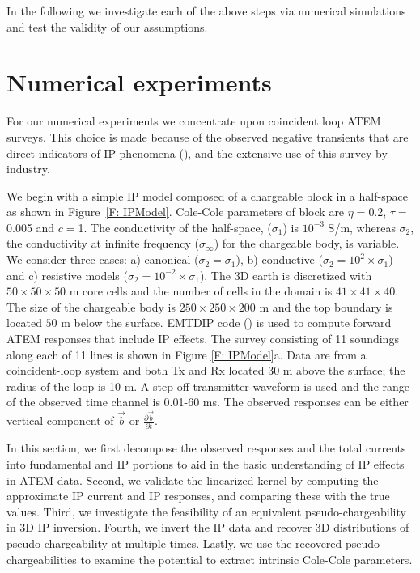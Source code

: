 \documentclass[a4paper, 11pt]{article}
\newcommand{\siginf}{\sigma_\infty}
\renewcommand {\b}  { {\vec b} }
\begin{document}
In the following we investigate each of the above steps via numerical simulations and test the validity of our assumptions. 


\section{Numerical experiments}
\label{section: numerical_examples}
For our numerical experiments we concentrate upon coincident loop ATEM surveys. This choice is made because of the observed negative transients that are direct indicators of IP phenomena (\cite{Kratzer2012,Kang2015a,Kang2015b,Doug2015}), and the extensive  use of this survey  by industry.  

We begin with a simple IP model composed of  a chargeable block in a half-space as shown in Figure~\ref{F: IPModel}.
Cole-Cole parameters of block are  $\eta=$0.2, $\tau=$0.005 and $c=$1.
The conductivity  of the half-space, ($\sigma_1$) is  $10^{-3}$ S/m, whereas $\sigma_2$, 
the conductivity at infinite frequency ($\siginf$) for the chargeable body, is variable.  
We consider three cases: a) canonical ($\sigma_2=\sigma_1$), b) conductive ($\sigma_2=10^2\times\sigma_1$) and c) resistive models ($\sigma_2=10^{-2}\times\sigma_1$).
The 3D earth is discretized with  $50\times50\times50$ m core cells and the number of cells in the domain is $41\times41\times40$.
The size of the chargeable body is $250\times250\times200$ m and the top boundary is located  $50$ m below the surface.
EMTDIP code (\cite{Marchant2014}) is used to compute forward ATEM responses that include IP effects. The survey consisting of 11 soundings along each of 11 lines is shown in Figure \ref{F: IPModel}a.
Data are from a  coincident-loop system and both Tx and Rx located 30 m above the surface; the radius of the loop is 10 m.
A step-off transmitter waveform is used and the range of the observed time channel is 0.01-60 ms. The observed responses can be either vertical component of $\b$ or $\frac{\partial \b}{\partial t}$.

In this section, we first decompose the observed responses and the total currents into fundamental and IP portions to aid in the basic understanding of IP effects in ATEM data. 
Second, we validate the linearized kernel by computing the approximate IP current and IP responses, and comparing these  with the true values. 
Third, we investigate the feasibility of an equivalent pseudo-chargeability in 3D IP inversion. 
Fourth, we invert the IP data and recover 3D distributions of pseudo-chargeability at multiple times.  Lastly, we use the recovered pseudo-chargeabilities to examine the potential to extract intrinsic Cole-Cole parameters. 
\end{document}
